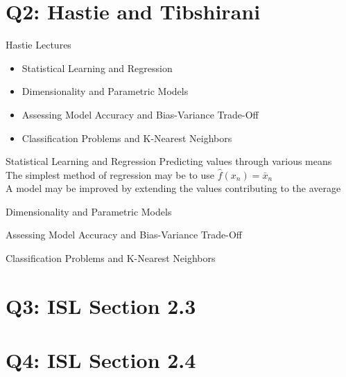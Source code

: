 \documentclass{beamer}
\begin{document}
\section[Q2]{Q2: Hastie and Tibshirani}

\begin{frame}{Hastie Lectures}
	\begin{itemize}
		\item Statistical Learning and Regression
		\item Dimensionality and Parametric Models
		\item Assessing Model Accuracy and Bias-Variance Trade-Off
		\item Classification Problems and K-Nearest Neighbors
	\end{itemize}
\end{frame}

\begin{frame}{Statistical Learning and Regression}
	Predicting values through various means \\
	The simplest method of regression may be to use 
	$\hat{f}(x_n) = \bar{x}_n $ \\
	A model may be improved by extending the values contributing to the average	
	
\end{frame}

\begin{frame}{Dimensionality and Parametric Models}

\end{frame}

\begin{frame}{Assessing Model Accuracy and Bias-Variance Trade-Off}

\end{frame}

\begin{frame}{Classification Problems and K-Nearest Neighbors}

\end{frame}

\section[Q3]{Q3: ISL Section 2.3}
\section[Q4]{Q4: ISL Section 2.4}
\end{document}
